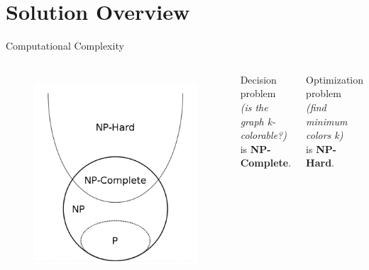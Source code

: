 \documentclass[12pt]{beamer}
\begin{document}
	\section{Solution Overview}
	\begin{frame}{Computational Complexity}
		\begin{columns}
			\begin{figure}[h]
				\centering
				\includegraphics[scale=0.5,width=0.8\linewidth]{diagrams/diagram-3.png}
				\label{fig:3}
			\end{figure}
			
			
			\centering	
			
			Decision problem \\ 
			\textit{(is the graph k-colorable?)} \\
			is \textbf{NP-Complete}. \\ \vspace{30pt} \pause
			
			Optimization problem \\ 
			\textit{(find minimum colors k)} \\
			is \textbf{NP-Hard}.
		\end{columns}
	\end{frame}
	
\end{document}

